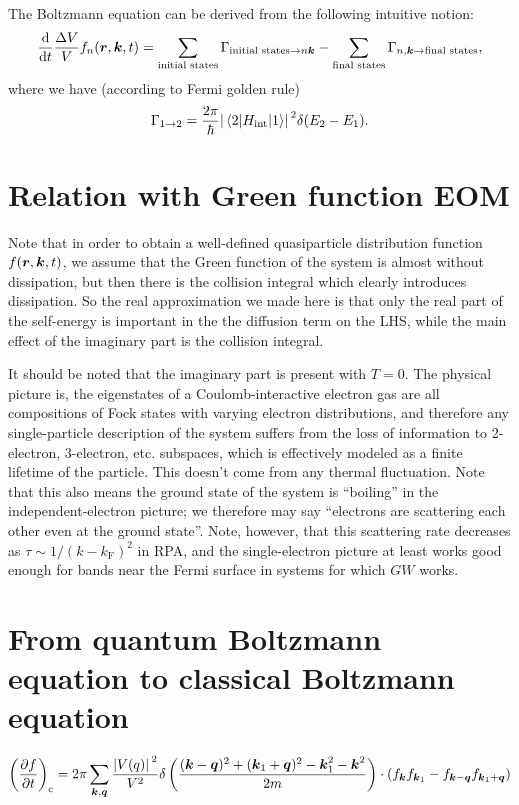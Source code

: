 \documentclass[hyperref, a4paper]{article}
\begin{document}
The Boltzmann equation can be derived from the following intuitive notion:
\[
    \dv{t} \frac{\Delta V}{V} f_n (\vb*{r}, \vb*{k}, t) 
    = \sum_{\text{initial states}} \Gamma_{\text{initial states} \to n \vb*{k}} 
    - \sum_{\text{final states}} \Gamma_{n, \vb*{k} \to \text{final states}} ,
\]
where we have (according to Fermi golden rule)
\begin{equation}
    \Gamma_{1 \to 2} = \frac{2\pi}{\hbar} 
    \abs*{\mel{2}{H_{\text{int}}}{1}}^2 
    \delta(E_2 - E_1).
\end{equation}

\section{Relation with Green function EOM}

Note that in order to obtain a well-defined 
quasiparticle distribution function $f(\vb*{r}, \vb*{k}, t)$,
we assume that the Green function of the system 
is almost without dissipation,
but then there is the collision integral
which clearly introduces dissipation. 
So the real approximation we made here is that
only the real part of the self-energy 
is important in the the diffusion term on the LHS, 
while the main effect of the imaginary part is the collision integral.

It should be noted that the imaginary part is present with $T = 0$.
The physical picture is, 
the eigenstates of a Coulomb-interactive electron gas 
are all compositions of Fock states with varying electron distributions, 
and therefore any single-particle description of the system 
suffers from the loss of information to 2-electron, 3-electron, etc. subspaces,
which is effectively modeled as a finite lifetime of the particle.
This doesn't come from any thermal fluctuation.
Note that this also means the ground state of the system is ``boiling''
in the independent-electron picture;
we therefore may say ``electrons are scattering each other even at the ground state''.
Note, however, that this scattering rate decreases as $\tau \sim 1/(k - k_{\text{F}})^2$ in RPA,
and the single-electron picture 
at least works good enough for bands near the Fermi surface 
in systems for which $GW$ works.

\section{From quantum Boltzmann equation to classical Boltzmann equation}

\begin{equation}
    \left(\pdv{f}{t}\right)_{\text{c}} = 2\pi 
    \sum_{\vb*{k}, \vb*{q}} \frac{\abs*{V(q)}^2}{V^2} 
    \delta\left(
        \frac{
            (\vb*{k} - \vb*{q})^2 + (\vb*{k}_1 + \vb*{q})^2 
            - \vb*{k}_1^2 - \vb*{k}^2
        }{2m}
    \right) \cdot (f_{\vb*{k}} f_{\vb*{k}_1} - f_{\vb*{k} - \vb*{q}} f_{\vb*{k}_1 + \vb*{q}})
\end{equation}
\end{document}

